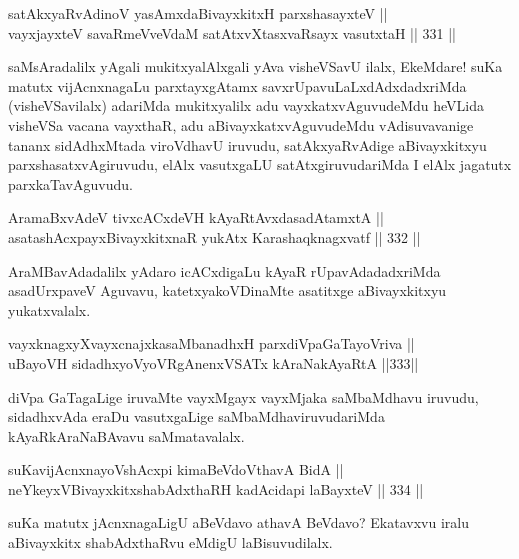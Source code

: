\begin{shl}
satAkxyaRvAdinoV yasAmxdaBivayxkitxH parxshasayxteV ||  \\
vayxjayxteV savaRmeVveVdaM satAtxvXtasxvaRsayx vasutxtaH \hfill || 331 ||  
\end{shl}

\begin{artha}
saMsAradalilx yAgali mukitxyalAlxgali yAva visheVSavU ilalx, EkeMdare!
suKa matutx vijAcnxnagaLu parxtayxgAtamx savxrUpavuLaLxdAdxdadxriMda
(visheVSavilalx) adariMda mukitxyalilx adu vayxkatxvAguvudeMdu heVLida
visheVSa vacana vayxthaR, adu aBivayxkatxvAguvudeMdu vAdisuvavanige
tananx sidAdhxMtada viroVdhavU iruvudu, satAkxyaRvAdige aBivayxkitxyu
parxshasatxvAgiruvudu, elAlx vasutxgaLU satAtxgiruvudariMda I elAlx
jagatutx parxkaTavAguvudu.
\end{artha}

\begin{shl}
AramaBxvAdeV tivxcACxdeVH kAyaRtAvxdasadAtamxtA || \\
asatashAcxpayxBivayxkitxnaR yukAtx Karashaqknagxvatf \hfill || 332 ||  
\end{shl}

\begin{artha}
AraMBavAdadalilx yAdaro icACxdigaLu kAyaR rUpa\-\break vAdadadxriMda
asadUrxpaveV Aguvavu, katetxyakoVDinaMte asatitxge aBivayxkitxyu
yukatxvalalx.
\end{artha}

\begin{shl}
vayxknagxyXvayxcnajxkasaMbanadhxH parxdiVpaGaTayoVriva || \\
uBayoVH sidadhxyoVyoVRgAnenxVSATx kAraNakAyaRtA \hfill ||333||  
\end{shl}

\begin{artha}
diVpa GaTagaLige iruvaMte vayxMgayx vayxMjaka saMbaMdhavu iruvudu,
sidadhxvAda eraDu vasutxgaLige saMbaMdhaviruvudariMda
kAyaRkAraNaBAvavu saMmatavalalx.
\end{artha}

\begin{shl}
suKavijAcnxnayoVshAcxpi kimaBeVdoV\s thavA BidA || \\
neYkeyxV\s BivayxkitxshabAdxthaRH kadAcidapi laBayxteV \hfill || 334 ||  
\end{shl}

\begin{artha}
suKa matutx jAcnxnagaLigU aBeVdavo athavA BeVdavo? Ekatavxvu iralu
aBivayxkitx shabAdxthaRvu eMdigU laBisuvudilalx.
\end{artha}


